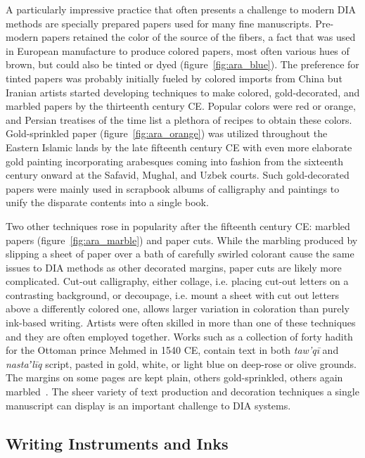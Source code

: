 A particularly impressive practice that often presents a challenge to modern
DIA methods are specially prepared papers used for many fine manuscripts.
Pre-modern papers retained the color of the source of the fibers, a fact that
was used in European manufacture to produce colored papers, most often various
hues of brown, but could also be tinted or dyed (figure~\ref{fig:ara_blue}).
The preference for tinted papers was probably initially fueled by colored
imports from China but Iranian artists started developing techniques to make
colored, gold-decorated, and marbled papers by the thirteenth century CE.
Popular colors were red or orange, and Persian treatises of the time list a
plethora of recipes to obtain these colors. Gold-sprinkled paper
(figure~\ref{fig:ara_orange}) was utilized throughout the Eastern Islamic lands
by the late fifteenth century CE with even more elaborate gold painting
incorporating arabesques coming into fashion from the sixteenth century onward
at the Safavid, Mughal, and Uzbek courts. Such gold-decorated papers were
mainly used in scrapbook albums of calligraphy and paintings to unify the
disparate contents into a single book. 

Two other techniques rose in popularity after the fifteenth century CE: marbled
papers (figure~\ref{fig:ara_marble}) and paper cuts. While the marbling
produced by slipping a sheet of paper over a bath of carefully swirled colorant
cause the same issues to DIA methods as other decorated margins, paper cuts are
likely more complicated.  Cut-out calligraphy, either collage, i.e. placing
cut-out letters on a contrasting background, or decoupage, i.e. mount a sheet
with cut out letters above a differently colored one, allows larger variation
in coloration than purely ink-based writing. Artists were often skilled in more
than one of these techniques and they are often employed together. Works such
as a collection of forty hadith for the Ottoman prince Mehmed in 1540 CE,
contain text in both \emph{taw'qī} and \emph{nastaʼlīq} script, pasted in gold,
white, or light blue on deep-rose or olive grounds. The margins on some pages
are kept plain, others gold-sprinkled, others again marbled~\cite[pg.
52-56]{blair2006islamic}. The sheer variety of text production and decoration
techniques a single manuscript can display is an important challenge to DIA
systems.

\subsection{Writing Instruments and Inks}

